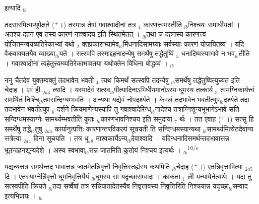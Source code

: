 \documentclass[article,12pt,a4paper]{memoir}%
\newcommand{\add}[1]{($^{+}$#1)}
\newcounter{parCount}
\begin{document}
	  
	  
	    \pstart  \leavevmode%
	    \hphantom{.}
	   इत्यादि
	{}
	\pend%
      {\tiny $_{lb}$}

	  
	  \pstart \leavevmode%
	तदसारमित्यप्युपेक्षते \add{।} तस्मान्न तेषां गवाश्वादीनां तत्र {\tiny $_{1}$} कारणत्त्वमस्तीति {\tiny $_{lb}$}निश्चयः समाधीयतां । अतश्च दहन एव तस्य कारणं नाश्वादय इति स्थितमेतत् । {\tiny $_{lb}$}तथा च दहनस्य कारणत्त्वं योजितमन्वयव्यतिरेकाभ्यां यथो {\tiny $_{2}$} क्तप्रकाराभ्यामेव{\tiny $_{lb}$}मिंधनादिसामग्र्याः सर्वस्याः कारणं योजयितव्यं । यदि वैकवाक्यतयैव व्याख्या{\tiny $_{lb}$}यते । सत्स्वपि तस्माद्दहनादन्येषु समर्थेषु तद्धेतुष्विं {\tiny $_{3}$} धनादिष्वस्याभावे न भव{\tiny $_{lb}$}तीति । गवाश्वादीनां त्वहेतुत्त्वम्व्यतिरेकाभावतया यथोक्तेन विधिना बोद्धव्यं ।
	{}
	\pend%
      {\tiny $_{lb}$}

	  
	  \pstart \leavevmode%
	ननु चैतदेव युक्तम्वक्तुं तदभावेन भवती {\tiny $_{4}$} त्यथ किमर्थं सत्स्वपि तदन्येषु {\tiny $_{lb}$}समर्थेषु तद्धेतुष्वित्युच्यत इति चेदाह । {\color{DodgerBlue3}एवं ही} {\tiny $_{2a4}$} त्यादि । यस्मादेवं सत्स्व{\tiny $_{lb}$}पीत्यादिनाऽभिधीयमानोऽस्य धूमस्य तत्कार्य {\tiny $_{5}$} त्वमग्निकार्यत्त्वं समर्थितं निश्चि{\tiny $_{lb}$}तमसन्दिग्धम्भवति । अन्यथा यद्येवं नोपदर्श्यते । केवलं तदभावेन भवतीत्युप{\tiny $_{lb}$}दर्श्यते तदा तदभावेन भवतीत्युप {\tiny $_{6}$} दर्शने क्रियमाणेन्यस्यापि तु गवाश्वादेरिन्ध{\tiny $_{lb}$}नादेश्च तत्राग्निशून्यभूभागेऽभावे सति सन्दिग्धमस्याग्नेः सामर्थ्यम्भवतीति कुतः {\tiny $_{lb}$}कारणभावनिश्चय इति समुदाया {\tiny $_{7}$} र्थः । तत एवाह \add{।} {\color{DodgerBlue3}सत्सु हि समर्थेषु तद्धे{\tiny $_{lb}$}तुषु {\tiny $_{2a3}$} कार्यानुत्पत्तिः कारणान्तरविकल्पं सूचयती} ति सन्दिग्धमस्यान्यथा {\tiny $_{lb}$}सामर्थ्यमित्येतदेवान्य {\color{DodgerBlue3}त्तत्रेत्या} {\tiny $_{2a4}$} दिना सूचयति । तत्र धू {\tiny $_{8}$} माश्वकार्येऽन्य{\tiny $_{lb}$}देवाश्वादि । यदिन्धनादिसमर्थन्तदभावात्तन्न भूतन्दहनशून्यदेशे । अस्य स्वभावा{\tiny $_{lb}$}त्तन्न जातमिति कुतोयं निश्चय इत्यर्थः ।
	{}
	\pend%
      {\tiny $_{lb}$}\textsuperscript{\textenglish{16/s}}

	  
	  \pstart \leavevmode%
	 \leavevmode{}यद्यन्यत्तत्र समर्थन्तद भावात्तन्न जातमेतन्निवृत्तौ निवृत्तिस्तर्ह्यस्य कथमिति {\tiny $_{lb}$}चेदाह \add{।} {\color{DodgerBlue3}एतन्निवृत्तावित्या {\tiny $_{2a5}$} दि} । एतस्याग्नेर्न्निवृत्तौ धूमनिवृत्तिर्येयं {\tiny $_{lb}$}धूमस्य सा यदृच्छासम्वादः । {\color{DodgerBlue3}काकता {\tiny $_{1}$} ली} यन्यायेनेत्यर्थः । यदा तु सत्स्वपीति क्रियते {\tiny $_{lb}$}तदा सर्व्वेषां तत्र सन्निपातादेतस्यैव निवृत्तावस्य निवृत्तिरिति निश्चयान्न यदृच्छा{\tiny $_{lb}$}सम्वाद इत्यभिप्रायः ।
	{}
	\pend%
      {\tiny $_{lb}$}
\end{document}
